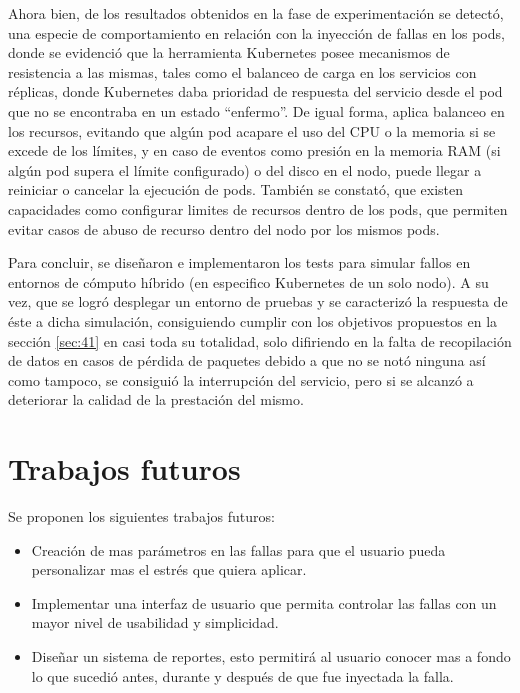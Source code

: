 \par Ahora bien, de los resultados obtenidos en la fase de experimentación se detectó, una especie de comportamiento en relación con la inyección de fallas en los pods, donde se evidenció que la herramienta Kubernetes posee mecanismos de resistencia a las mismas, tales como el balanceo de carga en los servicios con réplicas, donde Kubernetes daba prioridad de respuesta del servicio desde el pod que no se encontraba en un estado ``enfermo''. De igual forma, aplica balanceo en los recursos, evitando que algún pod acapare el uso del CPU o la memoria si se excede de los límites, y en caso de eventos como presión en la memoria RAM (si algún pod supera el límite configurado) o del disco en el nodo, puede llegar a reiniciar o cancelar la ejecución de pods. También se constató, que existen capacidades como configurar limites de recursos dentro de los pods, que permiten evitar casos de abuso de recurso dentro del nodo por los mismos pods.\\

\par Para concluir, se diseñaron e implementaron los tests para simular fallos en entornos de cómputo híbrido (en especifico Kubernetes de un solo nodo). A su vez, que se logró desplegar un entorno de pruebas y se caracterizó la respuesta de éste a dicha simulación, consiguiendo cumplir con los objetivos propuestos en la sección \ref{sec:41} en casi toda su totalidad, solo difiriendo en la falta de recopilación de datos en casos de pérdida de paquetes debido a que no se notó ninguna así como tampoco, se consiguió la interrupción del servicio, pero si se alcanzó a deteriorar la calidad de la prestación del mismo.


\section{Trabajos futuros}
\par Se proponen los siguientes trabajos futuros:

\begin{itemize}
\item Creación de mas parámetros en las fallas para que el usuario pueda personalizar mas el estrés que quiera aplicar.
\item Implementar una interfaz de usuario que permita controlar las fallas con un mayor nivel de usabilidad y simplicidad.
\item Diseñar un sistema de reportes, esto permitirá al usuario conocer mas a fondo lo que sucedió antes, durante y después de que fue inyectada la falla.
\end{itemize}

